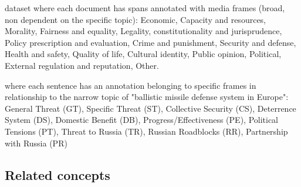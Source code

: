 \cite{card2015media} dataset where each document has spans annotated with media frames (broad, non dependent on the specific topic): Economic, Capacity and resources, Morality, Fairness and equality, Legality, constitutionality and jurisprudence, Policy prescription and evaluation, Crime and punishment, Security and defense, Health and safety, Quality of life, Cultural identity, Public opinion, Political, External regulation and reputation, Other.

\cite{morstatter2018identifying} where each sentence has an annotation belonging to specific frames in relationship to the narrow topic of "ballistic missile defense system in Europe": General Threat (GT), Specific Threat (ST), Collective Security (CS), Deterrence System (DS), Domestic Benefit (DB), Progress/Effectiveness (PE), Political Tensions (PT), Threat to Russia (TR), Russian Roadblocks (RR), Partnership with Russia (PR)







\subsection{Related concepts}
\label{ssec:lit_framing_other}

